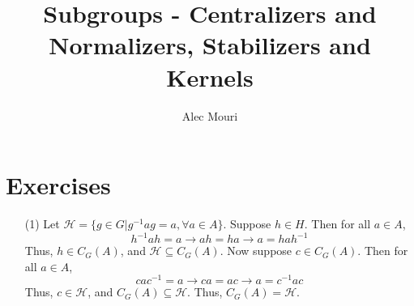 \documentclass[12pt]{article}
\begin{document}
\title{Subgroups - Centralizers and Normalizers, Stabilizers and Kernels}
\author{Alec Mouri}

\maketitle
\section*{Exercises}
\begin{itemize}
\item[(1)]
Let $\mathcal{H} = \{ g \in G | g^{-1}ag = a, \forall a \in A \}$. Suppose $h \in H$. Then for all $a \in A$, 
$$h^{-1}ah = a \rightarrow ah = ha \rightarrow a = hah^{-1}$$
Thus, $h \in C_G(A)$, and $\mathcal{H} \subseteq C_G(A)$. Now suppose $c \in C_G(A)$. Then for all $a \in A$,
$$cac^{-1} = a \rightarrow ca = ac \rightarrow a = c^{-1}ac$$
Thus, $c \in \mathcal{H}$, and $C_G(A) \subseteq \mathcal{H}$. Thus, $C_G(A) = \mathcal{H}$.
\end{itemize}
\end{document}
